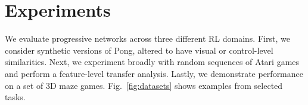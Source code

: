 \section{Experiments}

We evaluate progressive networks across three different RL domains.
First, we consider synthetic versions of Pong,
altered to have visual or control-level
similarities. Next, we experiment broadly with random
sequences of Atari games and perform a feature-level transfer analysis.
Lastly, we demonstrate performance
on a set of 3D maze games. Fig.~\ref{fig:datasets} shows examples from selected tasks.

\begin{figure}[h]
\centering
{}
\end{figure}
